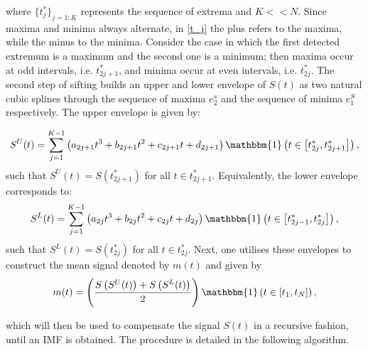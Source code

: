 where $ \{ t_j^{*} \}_{j = 1: K}$ represents the sequence of extrema and $K << N$. Since maxima and minima always alternate, in \ref{t_j} the plus refers to the maxima, while the minus to the minima. Consider the case in which the first detected extremum is a maximum and the second one is a minimum; then maxima occur at odd intervals, i.e. $t^*_{2j+1}$, and minima occur at even intervals, i.e. $t^*_{2j}$. The second step of sifting builds an upper and lower envelope of $S(t)$ as two natural cubic splines through the sequence of maxima $e_2^s$ and the sequence of minima $e_1^S$ respectively. The upper envelope is given by:

\begin{equation}
\label{upper_env}
S^{U}(t) = \sum_{j=1}^{K-1} \left( a_{2j+1}  t^3 + b_{2j+1} t^2 + c_{2j+1} t  +d_{2j+1} \right) \mathbbm{1} \left( t \in \left[ t^*_{2j}, t^*_{2j+1} \right] \right),
\end{equation}
such that $S^U (t) = S(t^*_{2j+1})$ for all $ t \in t^*_{2j+1}$. Equivalently, the lower envelope corresponds to: 
\begin{equation}
\label{lower_env}
S^{L}(t) = \sum_{j=1}^{K-1} \left( a_{2j}  t^3 + b_{2j} t^2 + c_{2j} t  +d_{2j} \right)   \mathbbm{1} \left( t \in \left[ t^*_{2j-1}, t^*_{2j} \right] \right),
\end{equation}
such that $S^L (t) = S(t^*_{2j})$ for all $ t \in t^*_{2j}$. Next, one utilises these envelopes to construct the mean signal denoted by $m(t)$ and given by
\begin{equation}
m(t) = \left( \frac{S \left( S^{U}(t) \right)+S \left( S^{L}(t) \right)}{2} \right) \mathbbm{1} \left( t \in [t_1, t_N] \right),
\end{equation}

which will then be used to compensate the signal $S(t)$ in a recursive fashion, until an IMF is obtained.  The procedure is detailed in the following algorithm.


